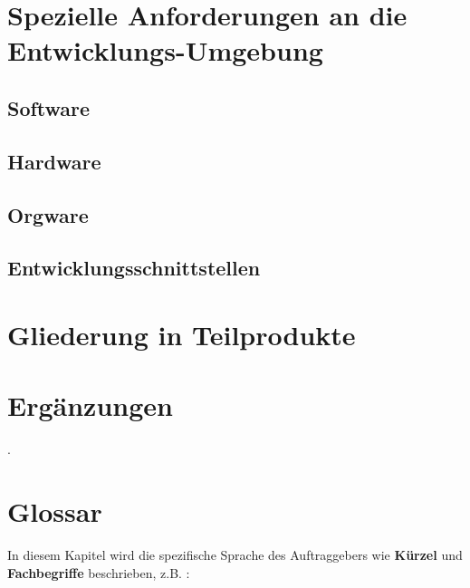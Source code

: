 	
	\section{\Large Spezielle Anforderungen an die Entwicklungs-Umgebung}
	
	\subsection{Software}
	\subsection{Hardware}
	\subsection{Orgware}
	\subsection{Entwicklungsschnittstellen}
	
	
	\section{\Large Gliederung in Teilprodukte}
	
	
	\section{\Large Ergänzungen}
	.
	
\newpage
	\section{\Large Glossar}
	In diesem Kapitel wird die spezifische Sprache des Auftraggebers wie \textbf{ Kürzel } und \textbf{ Fachbegriffe } beschrieben, z.B. :
	
		
		